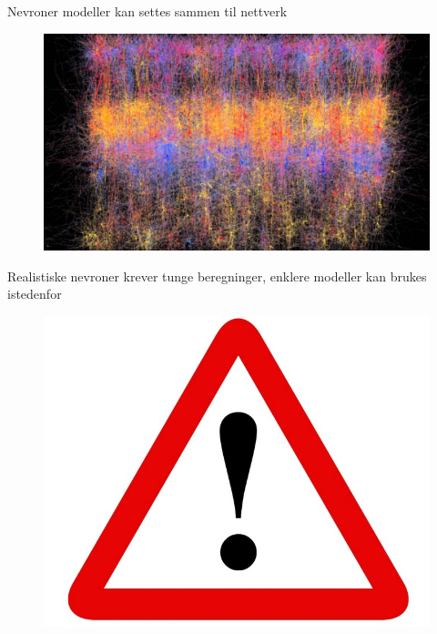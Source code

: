 \documentclass[presentation]{beamer}
\begin{document}
\begin{frame}{Nevroner modeller kan settes sammen til nettverk}
   \begin{figure}
     {\includegraphics[width=1\textwidth]{network_large.jpg}}
\end{figure}
\end{frame}

\begin{frame}{Realistiske nevroner krever tunge beregninger, enklere modeller kan brukes istedenfor}
   \begin{figure}
     {\includegraphics[width=1\textwidth]{alert.jpg}}
\end{figure}
\end{frame}
\end{document}
